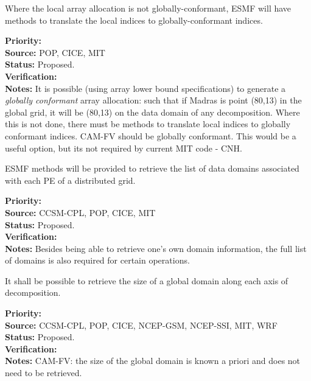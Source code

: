 
Where the local array allocation is not globally-conformant, 
ESMF will have methods to translate the local indices to
globally-conformant indices.

\begin{reqlist}
{\bf Priority:} \\
{\bf Source:} POP, CICE, MIT \\
{\bf Status:} Proposed. \\
{\bf Verification:} \\
{\bf Notes:} It is possible (using array lower bound specifications)
  to generate a \emph{globally conformant} array allocation: such that
  if Madras is point (80,13) in the global grid, it will be (80,13) on
  the data domain of any decomposition. Where this is not done, there
  must be methods to translate local indices to globally conformant
  indices.  CAM-FV should be globally conformant. 
  This would be a useful option, but its not
  required by current MIT code - CNH.
\end{reqlist}


ESMF methods will be provided to retrieve the list of data
domains associated with each PE of a distributed grid.

\begin{reqlist}
{\bf Priority:} \\
{\bf Source:} CCSM-CPL, POP, CICE, MIT \\
{\bf Status:} Proposed. \\
{\bf Verification:} \\
{\bf Notes:} Besides being able to retrieve one's own domain
  information, the full list of domains is also required for certain
  operations.
\end{reqlist}



It shall be possible to retrieve the size of a global domain
along each axis of decomposition.

\begin{reqlist}
{\bf Priority:} \\
{\bf Source:} CCSM-CPL, POP, CICE, NCEP-GSM, NCEP-SSI, MIT, WRF \\
{\bf Status:} Proposed. \\
{\bf Verification:} \\
{\bf Notes:} CAM-FV: the size of the global domain is known
a priori and does not need to be retrieved.
\end{reqlist}

